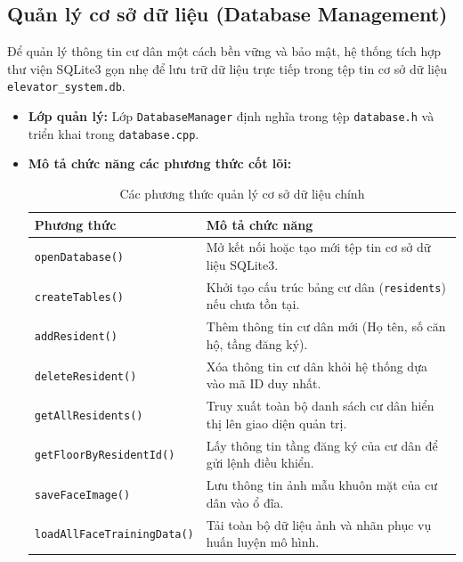 \documentclass[12pt,a4paper]{article}
\begin{document}
\subsection{Quản lý cơ sở dữ liệu (Database Management)}
Để quản lý thông tin cư dân một cách bền vững và bảo mật, hệ thống tích hợp thư viện SQLite3 gọn nhẹ để lưu trữ dữ liệu trực tiếp trong tệp tin cơ sở dữ liệu \texttt{elevator\_system.db}.
\begin{itemize}
    \item \textbf{Lớp quản lý:} Lớp \texttt{DatabaseManager} định nghĩa trong tệp \texttt{database.h} và triển khai trong \texttt{database.cpp}.
    \item \textbf{Mô tả chức năng các phương thức cốt lõi:}
    \begin{table}[H]
        \centering
        \begin{tabular}{|l|p{9.5cm}|}
            \hline
            \textbf{Phương thức} & \textbf{Mô tả chức năng} \\ \hline
            \texttt{openDatabase()} & Mở kết nối hoặc tạo mới tệp tin cơ sở dữ liệu SQLite3. \\ \hline
            \texttt{createTables()} & Khởi tạo cấu trúc bảng cư dân (\texttt{residents}) nếu chưa tồn tại. \\ \hline
            \texttt{addResident()} & Thêm thông tin cư dân mới (Họ tên, số căn hộ, tầng đăng ký). \\ \hline
            \texttt{deleteResident()} & Xóa thông tin cư dân khỏi hệ thống dựa vào mã ID duy nhất. \\ \hline
            \texttt{getAllResidents()} & Truy xuất toàn bộ danh sách cư dân hiển thị lên giao diện quản trị. \\ \hline
            \texttt{getFloorByResidentId()} & Lấy thông tin tầng đăng ký của cư dân để gửi lệnh điều khiển. \\ \hline
            \texttt{saveFaceImage()} & Lưu thông tin ảnh mẫu khuôn mặt của cư dân vào ổ đĩa. \\ \hline
            \texttt{loadAllFaceTrainingData()} & Tải toàn bộ dữ liệu ảnh và nhãn phục vụ huấn luyện mô hình. \\ \hline
        \end{tabular}
        \caption{Các phương thức quản lý cơ sở dữ liệu chính}
        \label{tab:db_methods}
    \end{table}
\end{itemize}

\newpage
\end{document}
